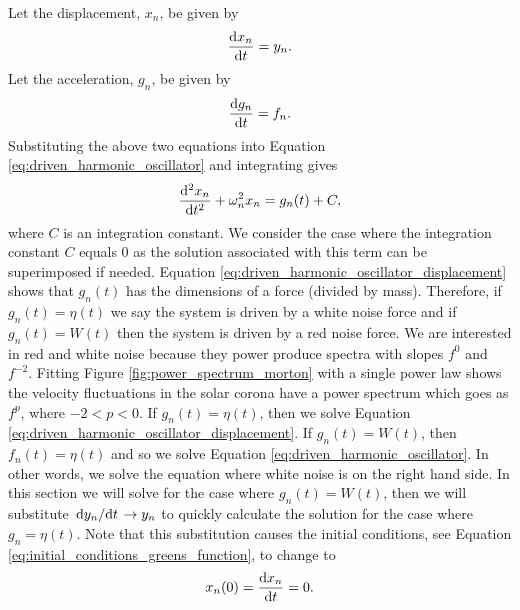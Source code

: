 Let the displacement, $x_n$, be given by
\begin{equation}
    \dv{x_n}{t} = y_n.
\end{equation}
Let the acceleration, $g_n$, be given by
\begin{equation}
    \dv{g_n}{t} = f_n.
\end{equation}
Substituting the above two equations into Equation \eqref{eq:driven_harmonic_oscillator} and integrating gives
\begin{equation}
    \label{eq:driven_harmonic_oscillator_displacement}
    \dv[2]{x_n}{t} + \omega_n^2x_n=g_n(t) + C,
\end{equation}
where $C$ is an integration constant. We consider the case where the integration constant $C$ equals 0 as the solution associated with this term can be superimposed if needed. Equation \eqref{eq:driven_harmonic_oscillator_displacement} shows that $g_n(t)$ has the dimensions of a force (divided by mass). Therefore, if $g_n(t)=\eta(t)$ we say the system is driven by a white noise force and if $g_n(t)=W(t)$ then the system is driven by a red noise force. We are interested in red and white noise because they power produce spectra with slopes $f^0$ and $f^{-2}$. Fitting Figure \ref{fig:power_spectrum_morton} with a single power law shows the velocity fluctuations in the solar corona have a power spectrum which goes as $f^p$, where $-2<p<0$. If $g_n(t)=\eta(t)$, then we solve Equation \eqref{eq:driven_harmonic_oscillator_displacement}. If $g_n(t)=W(t)$, then $f_n(t)=\eta(t)$ and so we solve Equation \eqref{eq:driven_harmonic_oscillator}. In other words, we solve the equation where white noise is on the right hand side. In this section we will solve for the case where $g_n(t)=W(t)$, then we will substitute $\dv*{y_n}{t}\rightarrow y_n$ to quickly calculate the solution for the case where $g_n = \eta(t)$. Note that this substitution causes the initial conditions, see Equation \eqref{eq:initial_conditions_greens_function}, to change to 
\begin{equation}
    x_n(0) = \dv{x_n}{t} = 0.
\end{equation}

